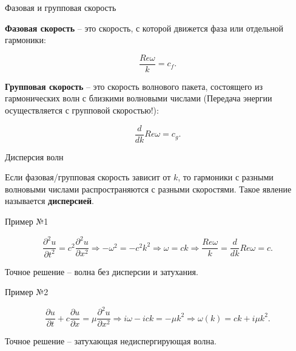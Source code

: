 \documentclass[10pt,xcolor=pst,aspectratio=169]{beamer}
\begin{document}
\begin{frame}{Фазовая и групповая скорость}

	\transdissolve[duration=0.1]
	\justifying
	\large

	\textbf{Фазовая скорость} -- это скорость, с которой движется фаза или отдельной гармоники:

	\[
		\frac{Re \omega}{k} = c_{f}.
	\]

	\textbf{Групповая скорость} -- это скорость волнового пакета, состоящего из гармонических волн с близкими волновыми числами (Передача энергии осуществляется с групповой скоростью!):

	\[
		\frac{d}{d k} Re \omega = c_{g}.
	\]

\end{frame}

\begin{frame}{Дисперсия волн}

	\transdissolve[duration=0.1]
	\justifying
	\large

	Если фазовая/групповая скорость зависит от $k$, то гармоники с разными волновыми числами распространяются с разными скоростями. Такое явление называется \textbf{дисперсией}.

\end{frame}

\begin{frame}{Пример №1}

	\transdissolve[duration=0.1]
	\justifying
	\large

	\[
		\frac{\partial^{2} u}{\partial t^{2}} = c^{2} \frac{\partial^{2} u}{\partial x^{2}} \Rightarrow - \omega^{2} = - c^{2} k^{2} \Rightarrow \omega = c k \Rightarrow \frac{Re \omega}{k} = \frac{d}{d k} Re \omega = c.
	\]
	
	Точное решение -- волна без дисперсии и затухания.

\end{frame}

\begin{frame}{Пример №2}

	\transdissolve[duration=0.1]
	\justifying
	\large

	\[
		\frac{\partial u}{\partial t} + c \frac{\partial u}{\partial x} = \mu \frac{\partial^{2} u}{\partial x^{2}} \Rightarrow i \omega - i c k = - \mu k^{2} \Rightarrow \omega(k) = c k + i \mu k^{2}.
	\]
	
	Точное решение -- затухающая недиспергирующая волна.

\end{frame}
\end{document}

